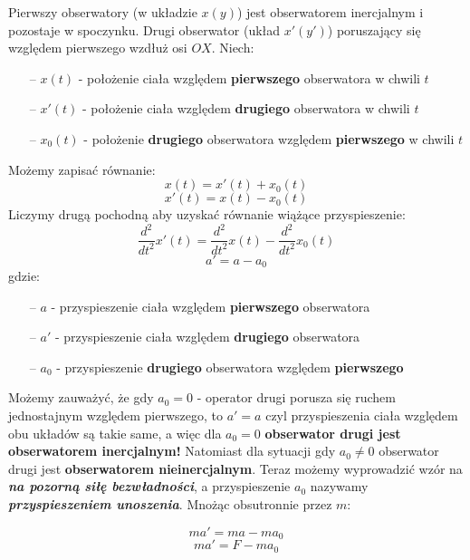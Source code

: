 \documentclass[a4paper]{article}
\begin{document}
    Pierwszy obserwatory (w układzie $x(y)$) jest obserwatorem inercjalnym i pozostaje w spoczynku. 
    Drugi obserwator (układ $x'(y')$) poruszający się względem pierwszego wzdłuż osi $OX$.
    Niech:
    \begin{itemize}
        \item [--] $x(t)$ - położenie ciała względem \textbf{pierwszego} obserwatora w chwili $t$
        \item [--] $x'(t)$ - położenie ciała względem \textbf{drugiego} obserwatora w chwili $t$
        \item [--] $x_0(t)$ - położenie \textbf{drugiego} obserwatora względem \textbf{pierwszego} w chwili $t$
    \end{itemize}
    Możemy zapisać równanie:
    \[x(t) = x'(t) + x_0(t)\]
    \[x'(t) = x(t) - x_0(t)\]
    Liczymy drugą pochodną aby uzyskać równanie wiążące przyspieszenie:
    \[\frac{d^2}{dt^2}x'(t) = \frac{d^2}{dt^2}x(t) - \frac{d^2}{dt^2}x_0(t)\]
    \[a' = a - a_0\]
    gdzie:
    \begin{itemize}
        \item [--] $a$ - przyspieszenie ciała względem \textbf{pierwszego} obserwatora
        \item [--] $a'$ - przyspieszenie ciała względem \textbf{drugiego} obserwatora
        \item [--] $a_0$ - przyspieszenie \textbf{drugiego} obserwatora względem \textbf{pierwszego}
    \end{itemize}
    Możemy zauważyć, że gdy $a_0 = 0$ - operator drugi porusza się ruchem jednostajnym względem pierwszego, 
    to $a' = a$ czyl przyspieszenia ciała względem obu układów są takie same, a więc dla $a_0 = 0$ \textbf{obserwator
    drugi jest obserwatorem inercjalnym!}
    Natomiast dla sytuacji gdy $a_0 \neq 0$ obserwator drugi jest \textbf{obserwatorem nieinercjalnym}. Teraz możemy
    wyprowadzić wzór na \textbf{\em{na pozorną siłę bezwładności}}, a przyspieszenie $a_0$ nazywamy \textbf{\em{przyspieszeniem unoszenia}}. 
    Mnożąc obsutronnie przez $m$:

    \[ma' = ma - ma_0\]
    \[ma' = F - ma_0\]
    
\end{document}
